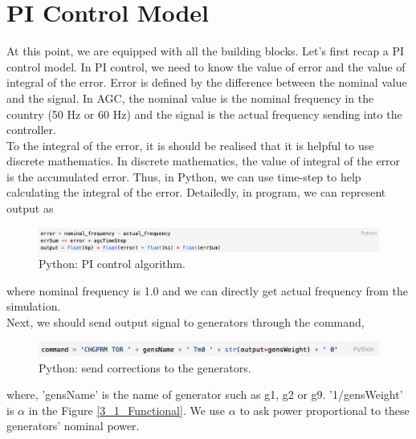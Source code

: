 \documentclass{report}
\begin{document}
\section{PI Control Model} %
At this point, we are equipped with all the building blocks. Let's first recap a PI control model. In PI control, we need to know the value of error and the value of integral of the error. Error is defined by the difference between the nominal value and the signal. In AGC, the nominal value is the nominal frequency in the country (50 Hz or 60 Hz) and the signal is the actual frequency sending into the controller.\\

To the integral of the error,  it is should be realised that it is helpful to use discrete mathematics. In discrete mathematics, the value of integral of the error is the accumulated error. Thus, in Python, we can use time-step to help calculating the integral of the error.  Detailedly, in program, we can represent output as\\

\begin{figure}[htbp]
\centering
\includegraphics[width = .999\textwidth]{figure/3_3_code1.png}
\caption{Python: PI control algorithm.}
\label{3_3_code1}
\end{figure}

where nominal frequency is 1.0 and we can directly get actual frequency from the simulation.\\

Next, we should send output signal to generators through the command,\\

\begin{figure}[htbp]
\centering
\includegraphics[width = .999\textwidth]{figure/3_3_code2.png}
\caption{Python: send corrections to the generators.}
\label{3_3_code2}
\end{figure}

where, 'gensName' is the name of generator such as g1, g2 or g9. '1/gensWeight' is $\alpha$ in the Figure \textcolor{red}{\ref{3_1_Functional}}. We use $\alpha$ to ask power proportional to these generators' nominal power. \\
\end{document}
